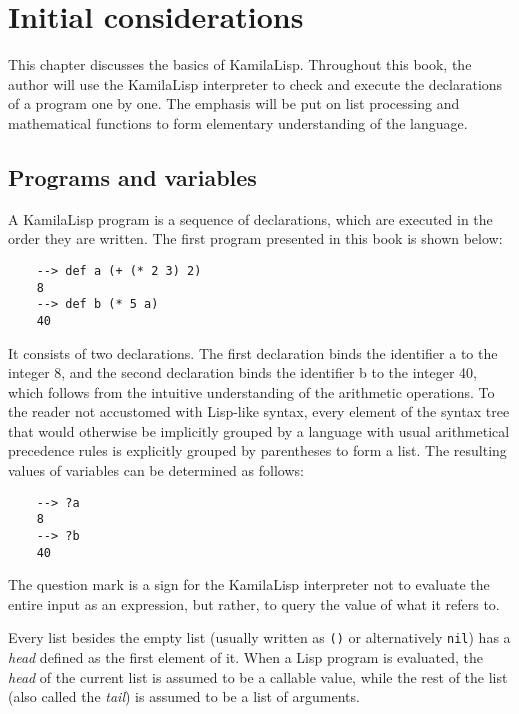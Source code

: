 
\chapter{Initial considerations}

This chapter discusses the basics of KamilaLisp. Throughout this book, the author will use the KamilaLisp interpreter to check and execute the declarations of a program one by one. The emphasis will be put on list processing and mathematical functions to form elementary understanding of the language.

\section{Programs and variables}

A KamilaLisp program is a sequence of declarations, which are executed in the order they are written. The first program presented in this book is shown below:

\begin{Verbatim}
    --> def a (+ (* 2 3) 2)
    8
    --> def b (* 5 a)
    40
\end{Verbatim}

It consists of two declarations. The first declaration binds the identifier a to the integer 8, and the second declaration binds the identifier b to the integer 40, which follows from the intuitive understanding of the arithmetic operations. To the reader not accustomed with Lisp-like syntax, every element of the syntax tree that would otherwise be implicitly grouped by a language with usual arithmetical precedence rules is explicitly grouped by parentheses to form a list. The resulting values of variables can be determined as follows:

\begin{Verbatim}
    --> ?a
    8
    --> ?b
    40
\end{Verbatim}

The question mark is a sign for the KamilaLisp interpreter not to evaluate the entire input as an expression, but rather, to query the value of what it refers to.

Every list besides the empty list (usually written as \verb|()| or alternatively \verb|nil|) has a \textit{head} defined as the first element of it. When a Lisp program is evaluated, the \textit{head} of the current list is assumed to be a callable value, while the rest of the list (also called the \textit{tail}) is assumed to be a list of arguments.

